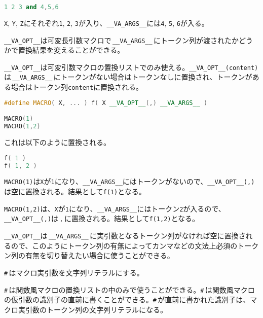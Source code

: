 \begin{lstlisting}[language={C++}]
1 2 3 and 4,5,6
\end{lstlisting}

\texttt{X}, \texttt{Y}, \texttt{Z}にそれぞれ\texttt{1}, \texttt{2}, \texttt{3}が入り、\texttt{\_\_VA\_ARGS\_\_}には\texttt{4}, \texttt{5}, \texttt{6}が入る。


\texttt{\_\_VA\_OPT\_\_}は可変長引数マクロで\,\texttt{\_\_VA\_ARGS\_\_}\,にトークン列が渡されたかどうかで置換結果を変えることができる。

\texttt{\_\_VA\_OPT\_\_}は可変引数マクロの置換リストでのみ使える。\texttt{\_\_VA\_OPT\_\_(content)}は\,\texttt{\_\_VA\_ARGS\_\_}\,{\allowbreak}にトークンがない場合はトークンなしに置換され、トークンがある場合はトークン列\texttt{content}に置換される。

\begin{lstlisting}[language={C++}]
#define MACRO( X, ... ) f( X __VA_OPT__(,) __VA_ARGS__ )

MACRO(1)
MACRO(1,2)
\end{lstlisting}

これは以下のように置換される。

\begin{lstlisting}[language={C++}]
f( 1 )
f( 1, 2 )
\end{lstlisting}

\texttt{MACRO(1)}は\texttt{X}が\texttt{1}になり、\texttt{\_\_VA\_ARGS\_\_}にはトークンがないので、\texttt{\_\_VA\_OPT\_\_(,)}は空に置換される。結果として\texttt{f(1)}となる。

\texttt{MACRO(1,2)}は、\texttt{X}が\texttt{1}になり、\texttt{\_\_VA\_ARGS\_\_}にはトークン\texttt{2}が入るので、\texttt{\_\_VA\_OPT\_\_(,)}は\,\texttt{,}\,に置換される。結果として\texttt{f(1,2)}となる。

\texttt{\_\_VA\_OPT\_\_}は\,\texttt{\_\_VA\_ARGS\_\_}\,に実引数となるトークン列がなければ空に置換されるので、このようにトークン列の有無によってカンマなどの文法上必須のトークン列の有無を切り替えたい場合に使うことができる。


\texttt{\#}\,はマクロ実引数を文字列リテラルにする。

\texttt{\#}\,は関数風マクロの置換リストの中のみで使うことができる。\texttt{\#}\,は関数風マクロの仮引数の識別子の直前に書くことができる。\texttt{\#}\,が直前に書かれた識別子は、マクロ実引数のトークン列の文字列リテラルになる。

